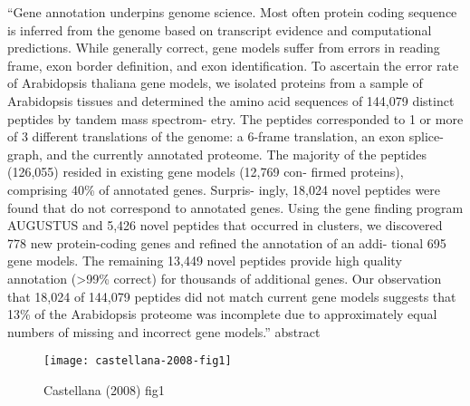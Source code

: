     ``Gene annotation underpins genome science. Most often protein coding
    sequence is inferred from the genome based on transcript evidence and
    computational predictions. While generally correct, gene models suffer from
    errors in reading frame, exon border definition, and exon identification.
    To ascertain the error rate of Arabidopsis thaliana gene models, we
    isolated proteins from a sample of Arabidopsis tissues and determined the
    amino acid sequences of 144,079 distinct peptides by tandem mass spectrom-
    etry. The peptides corresponded to 1 or more of 3 different translations of
    the genome: a 6-frame translation, an exon splice- graph, and the currently
    annotated proteome. The majority of the peptides (126,055) resided in
    existing gene models (12,769 con- firmed proteins), comprising 40\% of
    annotated genes. Surpris- ingly, 18,024 novel peptides were found that do
    not correspond to annotated genes. Using the gene finding program AUGUSTUS
    and 5,426 novel peptides that occurred in clusters, we discovered 778 new
    protein-coding genes and refined the annotation of an addi- tional 695 gene
    models. The remaining 13,449 novel peptides provide high quality annotation
    (>99\% correct) for thousands of additional genes. Our observation that
    18,024 of 144,079 peptides did not match current gene models suggests that
    13\% of the Arabidopsis proteome was incomplete due to approximately equal
    numbers of missing and incorrect gene models.'' abstract

    \begin{figure}[!hbpt]
        \centering
        \texttt{[image: castellana-2008-fig1]}
        \caption{Castellana (2008) fig1}
    \end{figure}
    \FloatBarrier
